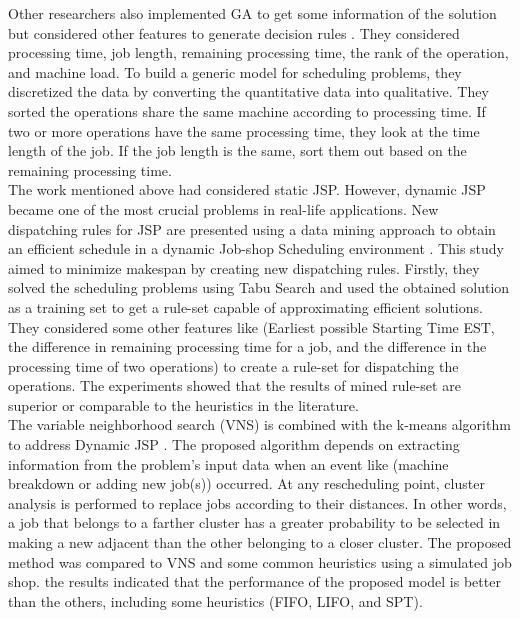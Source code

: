 \documentclass[runningheads]{llncs}
\begin{document}
Other researchers also implemented GA to get some information of the solution but considered other features to generate decision rules \cite{harrath2002genetic}. They considered processing time, job length, remaining processing time, the rank of the operation, and machine load. To build a generic model for scheduling problems, they discretized the data by converting the quantitative data into qualitative. They sorted the operations share the same machine according to processing time. If two or more operations have the same processing time, they look at the time length of the job. If the job length is the same, sort them out based on the remaining processing time.\\

The work mentioned above had considered static JSP. However, dynamic JSP became one of the most crucial problems in real-life applications. New dispatching rules for JSP are presented using a data mining approach to obtain an efficient schedule in a dynamic Job-shop Scheduling environment \cite{shahzad2010discovering}. This study aimed to minimize makespan by creating new dispatching rules. Firstly, they solved the scheduling problems using Tabu Search and used the obtained solution as a training set to get a rule-set capable of approximating efficient solutions. They considered some other features like (Earliest possible Starting Time EST, the difference in remaining processing time for a job, and the difference in the processing time of two operations) to create a rule-set for dispatching the operations. The experiments showed that the results of mined rule-set are superior or comparable to the heuristics in the literature.\\

The variable neighborhood search (VNS) is combined with the k-means algorithm to address Dynamic JSP \cite{adibi2014clustering}. The proposed algorithm depends on extracting information from the problem's input data when an event like (machine breakdown or adding new job(s)) occurred. At any rescheduling point, cluster analysis is performed to replace jobs according to their distances. In other words, a job that belongs to a farther cluster has a greater probability to be selected in making a new adjacent than the other belonging to a closer cluster. The proposed method was compared to VNS and some common heuristics using a simulated job shop. the results indicated that the performance of the proposed model is better than the others, including some heuristics (FIFO, LIFO, and SPT).\\
\end{document}
